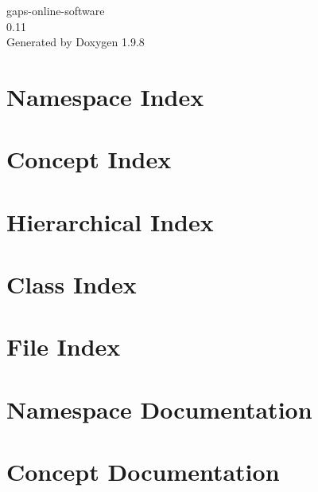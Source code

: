 \documentclass[twoside]{book}
\newcommand{\+}{\discretionary{\mbox{\scriptsize$\hookleftarrow$}}{}{}}
\newcommand{\clearemptydoublepage}{%
    \newpage{\pagestyle{empty}\cleardoublepage}%
  }
\begin{document}
  \raggedbottom
    \hypersetup{pageanchor=false,
                bookmarksnumbered=true,
                pdfencoding=unicode
               }
  \begin{titlepage}
  \vspace*{7cm}
  \begin{center}%
  {\Large gaps-\/online-\/software}\\
  [1ex]\large 0.\+11 \\
  \vspace*{1cm}
  {\large Generated by Doxygen 1.9.8}\\
  \end{center}
  \end{titlepage}
  \clearemptydoublepage
  \tableofcontents
  \clearemptydoublepage
  \hypersetup{pageanchor=true}


\chapter{Namespace Index}

\chapter{Concept Index}

\chapter{Hierarchical Index}

\chapter{Class Index}

\chapter{File Index}

\chapter{Namespace Documentation}



\chapter{Concept Documentation}

\end{document}
